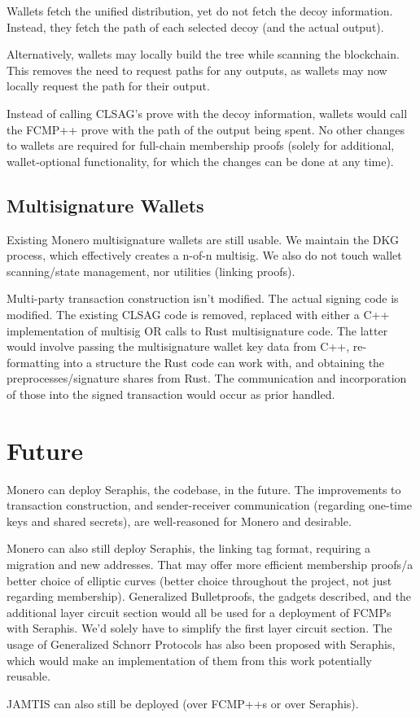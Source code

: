 \documentclass[]{article}
\begin{document}
Wallets fetch the unified distribution, yet do not fetch the decoy information. Instead, they fetch the path of each selected decoy (and the actual output).

Alternatively, wallets may locally build the tree while scanning the blockchain. This removes the need to request paths for any outputs, as wallets may now locally request the path for their output.

Instead of calling CLSAG's prove with the decoy information, wallets would call the FCMP++ prove with the path of the output being spent. No other changes to wallets are required for full-chain membership proofs (solely for additional, wallet-optional functionality, for which the changes can be done at any time).

\subsection{Multisignature Wallets}

Existing Monero multisignature wallets are still usable. We maintain the DKG process, which effectively creates a n-of-n multisig. We also do not touch wallet scanning/state management, nor utilities (linking proofs).

Multi-party transaction construction isn't modified. The actual signing code is modified. The existing CLSAG code is removed, replaced with either a C++ implementation of multisig OR calls to Rust multisignature code. The latter would involve passing the multisignature wallet key data from C++, re-formatting into a structure the Rust code can work with, and obtaining the preprocesses/signature shares from Rust. The communication and incorporation of those into the signed transaction would occur as prior handled.

\newpage

\section{Future}

Monero can deploy Seraphis, the codebase, in the future. The improvements to transaction construction, and sender-receiver communication (regarding one-time keys and shared secrets), are well-reasoned for Monero and desirable.

Monero can also still deploy Seraphis, the linking tag format, requiring a migration and new addresses. That may offer more efficient membership proofs/a better choice of elliptic curves (better choice throughout the project, not just regarding membership). Generalized Bulletproofs, the gadgets described, and the additional layer circuit section would all be used for a deployment of FCMPs with Seraphis. We'd solely have to simplify the first layer circuit section. The usage of Generalized Schnorr Protocols has also been proposed with Seraphis, which would make an implementation of them from this work potentially reusable.

JAMTIS can also still be deployed (over FCMP++s or over Seraphis).
\end{document}
